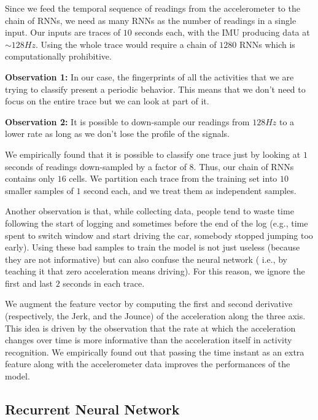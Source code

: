 \documentclass{article}
\begin{document}
Since we feed the temporal sequence of readings from the accelerometer to the chain of RNNs,
we need as many RNNs as the number of readings in a single input. Our inputs are traces of
$10$ seconds each, with the IMU producing data at $\sim 128Hz$. Using the whole trace would
require a chain of $1280$ RNNs which is computationally prohibitive.

\textbf{Observation 1:} In our
case, the fingerprints of all the activities that we are trying to classify present a periodic behavior.
This means that we don't need to focus on the entire trace but we can look at part of it.

\textbf{Observation 2:} It is possible to down-sample our readings from $128Hz$ to a lower
rate as long as we don't lose the profile of the signals.

We empirically found that it is possible to classify one trace just by looking at $1$ seconds of
readings down-sampled by a factor of $8$. Thus, our chain of RNNs contains only $16$ cells.
We partition each trace from the training set into $10$ smaller samples of $1$ second each,
and we treat them as independent samples.

Another observation is that, while collecting data, people tend to waste time following the start of
logging and sometimes before the end of the log (e.g., time spent to switch window and start
driving the car, somebody stopped jumping too early). Using these bad samples to train the model
is not just useless (because they are not informative) but can also confuse the neural network (
i.e., by teaching it that zero acceleration means driving). For this reason, we ignore the first and
last $2$ seconds in each trace.

We augment the feature vector by computing the first and second derivative (respectively,
the Jerk, and the Jounce) of the acceleration along the three axis. This idea is driven by the
observation that the rate at which the acceleration changes over time is more informative
than the acceleration itself in activity recognition. We empirically found out that passing
the time instant as an extra feature along with the accelerometer data improves the performances
of the model.


\subsection{Recurrent Neural Network}
\vspace{-.2cm}
\end{document}
